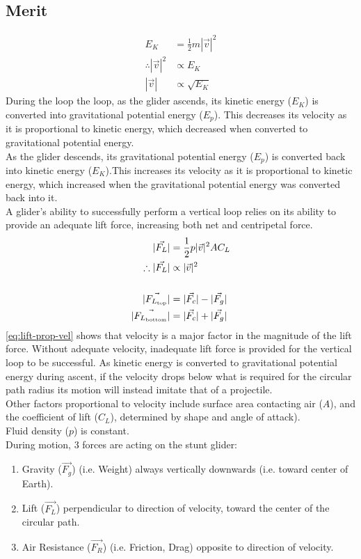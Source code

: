 \documentclass[11pt, a4paper]{article}
\def\ParagraphSpacing{30pt}
\begin{document}
	\subsection{Merit}
	\begin{align}
		E_K&=\frac{1}{2}m|\vec{v}|^2\\
		\therefore |\vec{v}|^2&\propto E_K\\
		|\vec{v}|&\propto \sqrt{E_K}
	\end{align}
	During the loop the loop, as the glider ascends, its kinetic energy ($E_K$) is converted into gravitational potential energy ($E_p$). This decreases its velocity as it is proportional to kinetic energy, which decreased when converted to gravitational potential energy. \\
	As the glider descends, its gravitational potential energy ($E_p$) is converted back into kinetic energy ($E_K$).This increases its velocity as it is proportional to kinetic energy, which increased when the gravitational potential energy was converted back into it.\\[\ParagraphSpacing]
	A glider's ability to successfully perform a vertical loop relies on its ability to provide an adequate lift force, increasing both net and centripetal force.
	\begin{align}
		|\vec{F_L}|&=\frac{1}{2}p|\vec{v}|^2AC_L \label{eq:lift}\\
		\therefore |\vec{F_L}|&\propto |\vec{v}|^2 \label{eq:lift-prop-vel} \\[\baselineskip]
		|\vec{F_{L_\text{top}}}|&=|\vec{F_c}|-|\vec{F_g}|\\
		|\vec{F_{L_\text{bottom}}}|&=|\vec{F_c}|+|\vec{F_g}|
	\end{align}
	\cref{eq:lift-prop-vel} shows that velocity is a major factor in the magnitude of the lift force. Without adequate velocity, inadequate lift force is provided for the vertical loop to be successful. As kinetic energy is converted to gravitational potential energy during ascent, if the velocity drops below what is required for the circular path radius its motion will instead imitate that of a projectile.\\
	Other factors proportional to velocity include surface area contacting air ($A$), and the coefficient of lift ($C_L$), determined by shape and angle of attack).\\
	Fluid density ($p$) is constant.\\[\ParagraphSpacing]
	During motion, 3 forces are acting on the stunt glider:
	\begin{enumerate}
		\item Gravity ($\vec{F_g}$) (i.e. Weight) always vertically downwards (i.e. toward center of Earth).
		\item Lift ($\vec{F_L}$) perpendicular to direction of velocity, toward the center of the circular path.
		\item Air Resistance ($\vec{F_R}$) (i.e. Friction, Drag) opposite to direction of velocity.
	\end{enumerate}
\end{document}
